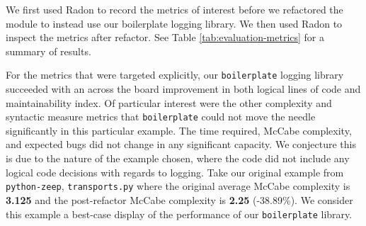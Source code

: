 \documentclass[acmsmall,review,authorversion]{acmart}
\newcommand{\code}[1]{\lstinline[basicstyle=\ttfamily\small]~#1~}
\begin{document}
We first used Radon to record the metrics of interest before we refactored the module to instead use our boilerplate logging library. We then used Radon to inspect the metrics after refactor. See Table \ref{tab:evaluation-metrics} for a summary of results.

For the metrics that were targeted explicitly, our \code{boilerplate} logging library succeeded with an across the board improvement in both logical lines of code and maintainability index. Of particular interest were the other complexity and syntactic measure metrics that \code{boilerplate} could not move the needle significantly in this particular example. The time required, McCabe complexity, and expected bugs did not change in any significant capacity. We conjecture this is due to the nature of the example chosen, where the code did not include any logical code decisions with regards to logging. Take our original example from \code{python-zeep}, \code{transports.py} where the original average McCabe complexity is \textbf{3.125} and the post-refactor McCabe complexity is \textbf{2.25} (-38.89\%). We consider this example a best-case display of the performance of our \code{boilerplate} library.
\end{document}
